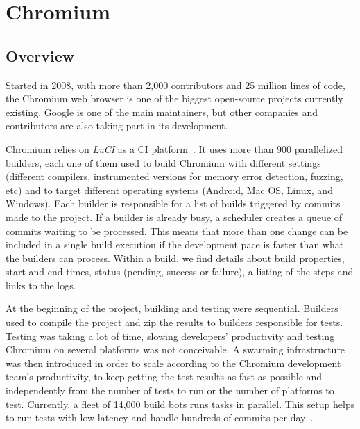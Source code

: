 \section{Chromium}
\label{sec:chromium-chromium}


\subsection{Overview}

Started in 2008, with more than 2,000 contributors and 25 million lines of code, the Chromium web browser is one of the biggest open-source projects currently existing. Google is one of the main maintainers, but other companies and contributors are also taking part in its development.

Chromium relies on \textit{LuCI} as a CI platform~\cite{onlineChromiumGithub}.
It uses more than 900 parallelized builders, each one of them used to build Chromium with different settings (\eg different compilers, instrumented versions for memory error detection, fuzzing, etc) and to target different operating systems (\eg Android, Mac OS, Linux, and Windows). 
Each builder is responsible for a list of builds triggered by commits made to the project. If a builder is already busy, a scheduler creates a queue of commits waiting to be processed. This means that more than one change can be included in a single build execution if the development pace is faster than what the builders can process. Within a build, we find details about build properties, start and end times, status (\ie pending, success or failure), a listing of the steps and links to the logs. 

At the beginning of the project, building and testing were sequential. Builders used to compile the project and zip the results to builders responsible for tests. Testing was taking a lot of time, slowing developers' productivity and testing Chromium on several platforms was not conceivable. A swarming infrastructure was then introduced in order to scale according to the Chromium development team's productivity, to keep getting the test results as fast as possible and independently from the number of tests to run or the number of platforms to test. Currently, a fleet of 14,000  build bots runs tasks in parallel. This setup helps to run tests with low latency and handle hundreds of commits per day~\cite{TheChromiumProjects}.

